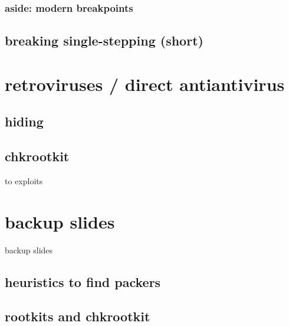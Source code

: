 

\subsubsection{aside: modern breakpoints}


\subsection{breaking single-stepping (short)}


\section{retroviruses / direct antiantivirus}


\subsection{hiding}


\subsection{chkrootkit}


\begin{frame}{to exploits}
\end{frame}







\section{backup slides}
\begin{frame}{backup slides}
\end{frame}

\subsection{heuristics to find packers}


\subsection{rootkits and chkrootkit}


